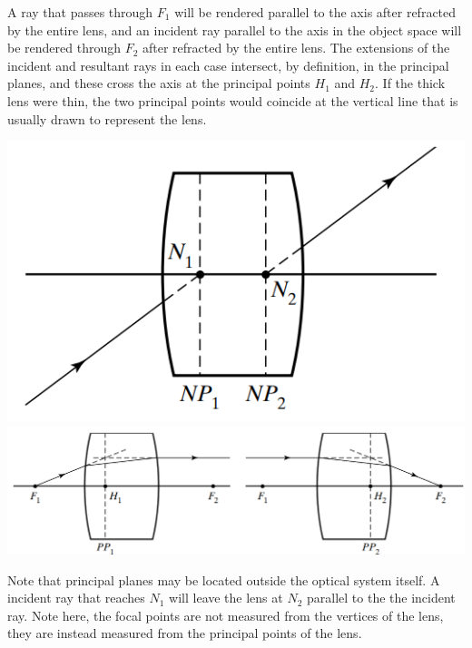 \documentclass[11pt]{book}
\theoremstyle{break}
\theoremstyle{break}
\begin{document}
A ray that passes through $F_1$ will be rendered parallel to the axis after refracted by the entire lens, and an incident ray parallel to the axis in the object space will be rendered through $F_2$ after refracted by the entire lens.  The extensions of the incident and resultant
rays in each case intersect, by definition, in the principal planes, and these cross
the axis at the principal points $H_1$ and $H_2$. If the thick lens were thin, the two principal points would coincide at the vertical line that is usually drawn to represent the lens. 
\begin{center}
\includegraphics[scale=0.43]{nodel.png}\\
\hfill\break
\hfill\break
\includegraphics[scale=0.43]{principal.png}
\end{center}
Note that principal planes may be located outside the optical system itself. A incident ray that reaches $N_1$ will leave the lens at $N_2$ parallel to the the incident ray. Note here, the focal points are not measured from the vertices of the lens, they are instead measured from the principal points of the lens. 
\newpage
\end{document}
